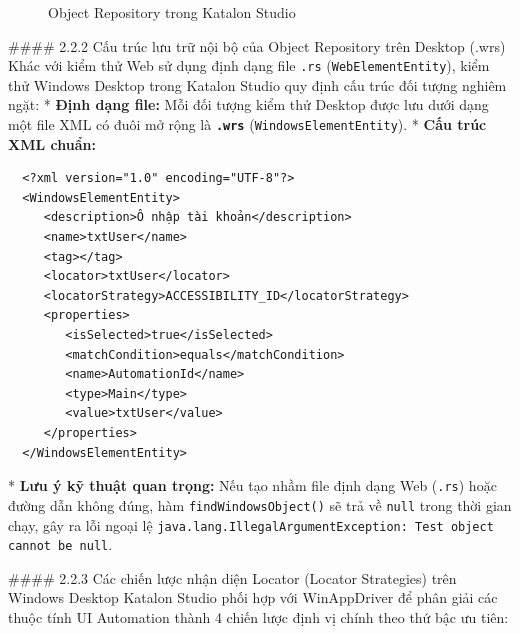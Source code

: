 \begin{figure}[H]
\centering
\caption{Object Repository trong Katalon Studio}
\end{figure}


#### 2.2.2 Cấu trúc lưu trữ nội bộ của Object Repository trên Desktop (.wrs)
Khác với kiểm thử Web sử dụng định dạng file \texttt{.rs} (\texttt{WebElementEntity}), kiểm thử Windows Desktop trong Katalon Studio quy định cấu trúc đối tượng nghiêm ngặt:
* \textbf{Định dạng file:} Mỗi đối tượng kiểm thử Desktop được lưu dưới dạng một file XML có đuôi mở rộng là \textbf{\texttt{.wrs}} (\texttt{WindowsElementEntity}).
* \textbf{Cấu trúc XML chuẩn:}
\begin{lstlisting}
  <?xml version="1.0" encoding="UTF-8"?>
  <WindowsElementEntity>
     <description>Ô nhập tài khoản</description>
     <name>txtUser</name>
     <tag></tag>
     <locator>txtUser</locator>
     <locatorStrategy>ACCESSIBILITY_ID</locatorStrategy>
     <properties>
        <isSelected>true</isSelected>
        <matchCondition>equals</matchCondition>
        <name>AutomationId</name>
        <type>Main</type>
        <value>txtUser</value>
     </properties>
  </WindowsElementEntity>
\end{lstlisting}

* \textbf{Lưu ý kỹ thuật quan trọng:} Nếu tạo nhầm file định dạng Web (\texttt{.rs}) hoặc đường dẫn không đúng, hàm \texttt{findWindowsObject()} sẽ trả về \texttt{null} trong thời gian chạy, gây ra lỗi ngoại lệ \texttt{java.lang.IllegalArgumentException: Test object cannot be null}.

#### 2.2.3 Các chiến lược nhận diện Locator (Locator Strategies) trên Windows Desktop
Katalon Studio phối hợp với WinAppDriver để phân giải các thuộc tính UI Automation thành 4 chiến lược định vị chính theo thứ bậc ưu tiên:

